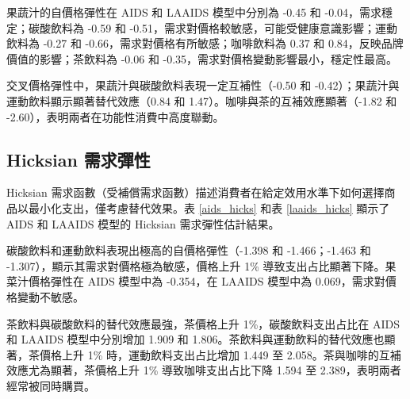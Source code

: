 果蔬汁的自價格彈性在 AIDS 和 LAAIDS 模型中分別為 -0.45 和 -0.04，需求穩定；碳酸飲料為 -0.59 和 -0.51，需求對價格較敏感，可能受健康意識影響；運動飲料為 -0.27 和 -0.66，需求對價格有所敏感；咖啡飲料為 0.37 和 0.84，反映品牌價值的影響；茶飲料為 -0.06 和 -0.35，需求對價格變動影響最小，穩定性最高。

交叉價格彈性中，果蔬汁與碳酸飲料表現一定互補性（-0.50 和 -0.42）；果蔬汁與運動飲料顯示顯著替代效應（0.84 和 1.47）。咖啡與茶的互補效應顯著（-1.82 和 -2.60），表明兩者在功能性消費中高度聯動。

\subsection{Hicksian 需求彈性}




Hicksian 需求函數（受補償需求函數）描述消費者在給定效用水準下如何選擇商品以最小化支出，僅考慮替代效果。表 \ref{aids_hicks} 和表 \ref{laaids_hicks} 顯示了 AIDS 和 LAAIDS 模型的 Hicksian 需求彈性估計結果。

碳酸飲料和運動飲料表現出極高的自價格彈性（-1.398 和 -1.466；-1.463 和 -1.307），顯示其需求對價格極為敏感，價格上升 1\% 導致支出占比顯著下降。果菜汁價格彈性在 AIDS 模型中為 -0.354，在 LAAIDS 模型中為 0.069，需求對價格變動不敏感。

茶飲料與碳酸飲料的替代效應最強，茶價格上升 1\%，碳酸飲料支出占比在 AIDS 和 LAAIDS 模型中分別增加 1.909 和 1.806。茶飲料與運動飲料的替代效應也顯著，茶價格上升 1\% 時，運動飲料支出占比增加 1.449 至 2.058。茶與咖啡的互補效應尤為顯著，茶價格上升 1\% 導致咖啡支出占比下降 1.594 至 2.389，表明兩者經常被同時購買。
